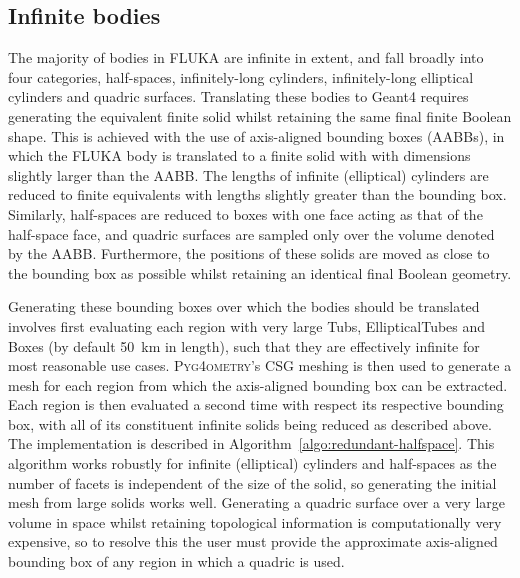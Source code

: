 \documentclass[final,5p,times,twocolumn]{elsarticle}
\newcommand{\PYGEOMETRY}{\textsc{Pyg4ometry}}
\begin{document}
\subsection{Infinite bodies}
The majority of bodies in FLUKA are infinite in extent, and fall
broadly into four categories, half-spaces, infinitely-long cylinders,
infinitely-long elliptical cylinders and quadric surfaces.
Translating these bodies to Geant4 requires generating the equivalent
finite solid whilst retaining the same final finite Boolean shape.
This is achieved with the use of axis-aligned bounding boxes (AABBs),
in which the FLUKA body is translated to a finite solid with with
dimensions slightly larger than the AABB.  The lengths of infinite
(elliptical) cylinders are reduced to finite equivalents with lengths
slightly greater than the bounding box.  Similarly, half-spaces are
reduced to boxes with one face acting as that of the half-space face,
and quadric surfaces are sampled only over the volume denoted by the
AABB.  Furthermore, the positions of these solids are moved as close
to the bounding box as possible whilst retaining an identical final
Boolean geometry.

Generating these bounding boxes over which the bodies should be translated
involves first evaluating each region with very large Tubs, EllipticalTubes
and Boxes (by default \SI{50}{\km} in length), such that they are
effectively infinite for most reasonable use cases.  \PYGEOMETRY{}'s CSG
meshing is then used to generate a mesh for each region from which the
axis-aligned bounding box can be extracted.  Each region is then evaluated
a second time with respect its respective bounding box, with all of its
constituent infinite solids being reduced as described above.  The
implementation is described in
Algorithm~\ref{algo:redundant-halfspace}. This algorithm works robustly for
infinite (elliptical) cylinders and half-spaces as the number of facets is
independent of the size of the solid, so generating the initial mesh from
large solids works well.  Generating a quadric surface over a very large
volume in space whilst retaining topological information is computationally
very expensive, so to resolve this the user must provide the approximate
axis-aligned bounding box of any region in which a quadric is used.
\end{document}
